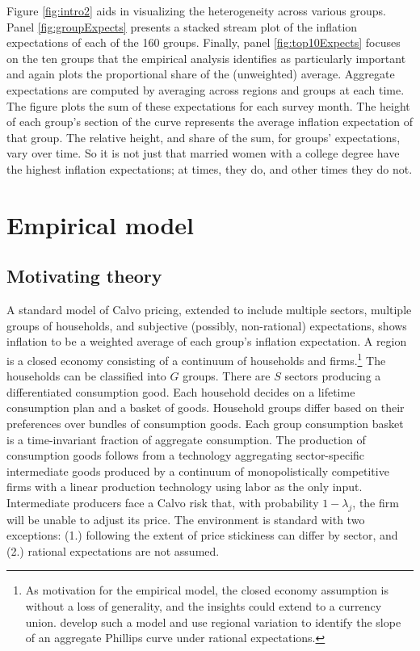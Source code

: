 \documentclass[12pt]{article}
\begin{document}
Figure \ref{fig:intro2} aids in visualizing the heterogeneity across various groups. Panel \ref{fig:groupExpects} presents a stacked stream plot of the inflation expectations of each of the 160 groups. Finally, panel \ref{fig:top10Expects} focuses on the ten groups that the empirical analysis identifies as particularly important and again plots the proportional share of the (unweighted) average. Aggregate expectations are computed by averaging across regions and groups at each time. The figure plots the sum of these expectations for each survey month. The height of each group's section of the curve represents the average inflation expectation of that group. The relative height, and share of the sum, for groups' expectations, vary over time. So it is not just that married women with a college degree have the highest inflation expectations; at times, they do, and other times they do not. 

\section{Empirical model}

\subsection{Motivating theory}

A standard model of Calvo pricing, extended to include multiple sectors, multiple groups of households, and subjective (possibly, non-rational) expectations, shows inflation to be a weighted average of each group's inflation expectation. A region is a closed economy consisting of a continuum of households and firms.\footnote{As motivation for the empirical model, the closed economy assumption is without a loss of generality, and the insights could extend to a currency union. \cite{NakamuraSteinsson:QJE2022} develop such a model and use regional variation to identify the slope of an aggregate Phillips curve under rational expectations.} The households can be classified into $G$ groups. There are $S$ sectors producing a differentiated consumption good. Each household decides on a lifetime consumption plan and a basket of goods. Household groups differ based on their preferences over bundles of consumption goods. Each group consumption basket is a time-invariant fraction of aggregate consumption. The production of consumption goods follows from a technology aggregating sector-specific intermediate goods produced by a continuum of monopolistically competitive firms with a linear production technology using labor as the only input. Intermediate producers face a Calvo risk that, with probability $1-\lambda_j$, the firm will be unable to adjust its price. The environment is standard with two exceptions: (1.) following \cite{Cravinoetal:JME2020} the extent of price stickiness can differ by sector, and (2.) rational expectations are not assumed.
\end{document}
